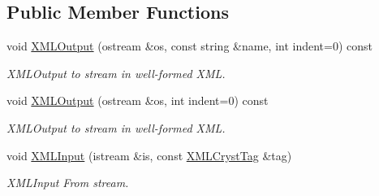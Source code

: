 \subsection*{Public Member Functions}
\begin{DoxyCompactItemize}
\item 
void \mbox{\hyperlink{class_obj_cryst_1_1_refinable_par_a007ed9f9d3939b26f4620d77022008dd}{X\+M\+L\+Output}} (ostream \&os, const string \&name, int indent=0) const
\begin{DoxyCompactList}\small\item\em X\+M\+L\+Output to stream in well-\/formed X\+ML. \end{DoxyCompactList}\item 
void \mbox{\hyperlink{class_obj_cryst_1_1_refinable_par_a2539f796654c2982b222b8056b04657f}{X\+M\+L\+Output}} (ostream \&os, int indent=0) const
\begin{DoxyCompactList}\small\item\em X\+M\+L\+Output to stream in well-\/formed X\+ML. \end{DoxyCompactList}\item 
void \mbox{\hyperlink{class_obj_cryst_1_1_refinable_par_af6fcabe9e97e0aabacef7a9bee5d1106}{X\+M\+L\+Input}} (istream \&is, const \mbox{\hyperlink{class_obj_cryst_1_1_x_m_l_cryst_tag}{X\+M\+L\+Cryst\+Tag}} \&tag)
\begin{DoxyCompactList}\small\item\em X\+M\+L\+Input From stream. \end{DoxyCompactList}\end{DoxyCompactItemize}
